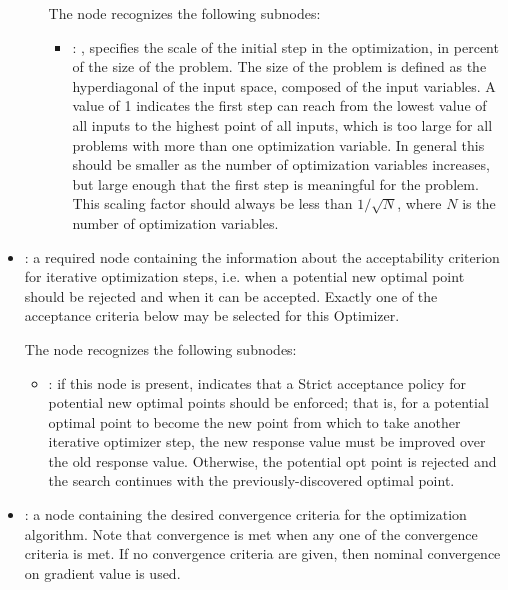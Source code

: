 \begin{itemize}
\begin{itemize}
          The  node recognizes the following subnodes:
          \begin{itemize}
            \item {}: ,
              specifies the scale of the initial step in the optimization, in percent of the
              size of the problem. The size of the problem is defined as the hyperdiagonal of the
              input space, composed of the input variables. A value of 1 indicates the first step
              can reach from the lowest value of all inputs to the highest point of all inputs,
              which is too large for all problems with more than one optimization variable. In
              general this               should be smaller as the number of optimization variables
              increases, but large enough               that the first step is meaningful for the
              problem. This scaling factor should always               be less than $1/\sqrt{N}$,
              where $N$ is the number of optimization variables. 
          \end{itemize}
      \end{itemize}

    \item {}:
      a required node containing the information about the acceptability criterion for iterative
      optimization steps, i.e. when a potential new optimal point should be rejected and when
      it can be accepted. Exactly one of the acceptance criteria               below may be selected
      for this Optimizer.

      The  node recognizes the following subnodes:
      \begin{itemize}
        \item {}:
          if this node is present, indicates that a Strict acceptance policy for         potential
          new optimal points should be enforced; that is, for a potential optimal point to
          become the new point from which to take another iterative optimizer step, the new response
          value         must be improved over the old response value. Otherwise, the potential opt
          point is rejected         and the search continues with the previously-discovered optimal
          point.
      \end{itemize}

    \item {}:
      a node containing the desired convergence criteria for the optimization algorithm.
      Note that convergence is met when any one of the convergence criteria is met. If no
      convergence               criteria are given, then nominal convergence on gradient value is
      used.


\end{itemize}
